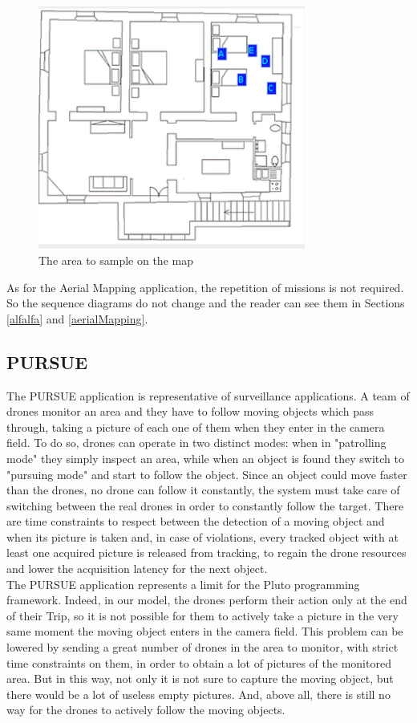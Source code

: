 \begin{figure}[H]
\centering
\includegraphics[width=\linewidth, height=8cm]{pictures/pm10Area.png}
\caption{The area to sample on the map}
\label{fig:pm10Area}
\end{figure}

As for the Aerial Mapping\cite{putti} application, the repetition of missions is not required.
So the sequence diagrams do not change and the reader can see them in Sections \ref{alfalfa} and \ref{aerialMapping}.


\subsection{PURSUE}\label{PURSUE}


The PURSUE application\cite{pursue} is representative of surveillance applications. A team of drones monitor an area and they have to follow moving objects which pass through, taking a picture of each one of them when they enter in the camera field.
To do so, drones can operate in two distinct modes: when in "patrolling mode" they simply inspect an area, while when an object is found they switch to "pursuing mode" and start to follow the object.
Since an object could move faster than the drones, no drone can follow it constantly, the system must take care of switching between the real drones in order to constantly follow the target.
There are time constraints to respect between the detection of a moving object and when its picture is taken and, in case of violations, every tracked object with at least one acquired picture is released from tracking, to regain the drone resources and lower the acquisition latency for the next object.
\\

The PURSUE application represents a limit for the Pluto programming framework.
Indeed, in our model, the drones perform their action only at the end of their Trip, so it is not possible for them to actively take a picture in the very same moment the moving object enters in the camera field.
This problem can be lowered by sending a great number of drones in the area to monitor, with strict time constraints on them, in order to obtain a lot of pictures of the monitored area.
But in this way, not only it is not sure to capture the moving object, but there would be a lot of useless empty pictures.
And, above all, there is still no way for the drones to actively follow the moving objects.

